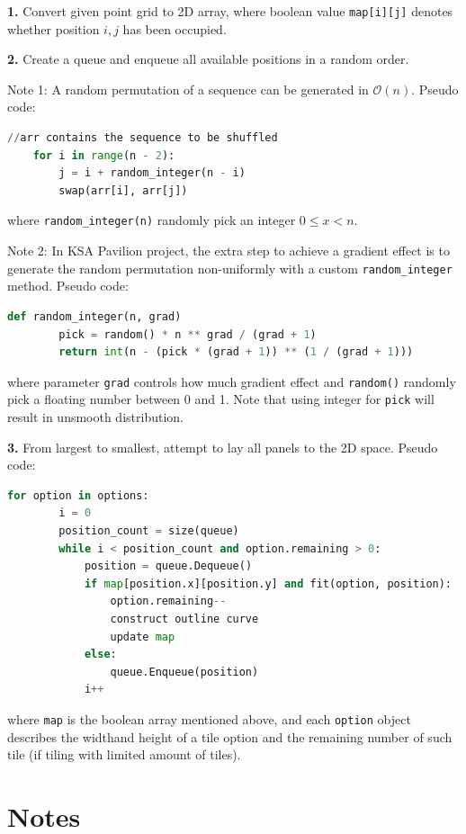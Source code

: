 \documentclass{article}
\begin{document}
\textbf{1.} Convert given point grid to 2D array, where boolean value \lstinline{map[i][j]} denotes whether position $i,j$ has been occupied.

\textbf{2.} Create a queue and enqueue all available positions in a random order.

Note 1: A random permutation of a sequence can be generated in $\mathcal{O}(n)$. Pseudo code:

\begin{lstlisting}[language=Python]
	//arr contains the sequence to be shuffled
	for i in range(n - 2):
		j = i + random_integer(n - i)
		swap(arr[i], arr[j])
\end{lstlisting}

where \lstinline{random_integer(n)} randomly pick an integer $0 \leq x < n$.

Note 2: In KSA Pavilion project, the extra step to achieve a gradient effect is to generate the random permutation non-uniformly with a custom \lstinline{random_integer} method. Pseudo code:

\begin{lstlisting}[language=Python]
	def random_integer(n, grad)
		pick = random() * n ** grad / (grad + 1)
		return int(n - (pick * (grad + 1)) ** (1 / (grad + 1)))
\end{lstlisting}

where parameter \lstinline{grad} controls how much gradient effect and \lstinline{random()} randomly pick a floating number between 0 and 1. Note that using integer for \lstinline{pick} will result in unsmooth distribution.

\textbf{3.} From largest to smallest, attempt to lay all panels to the 2D space. Pseudo code:

\begin{lstlisting}[language=Python]
	for option in options:
		i = 0
		position_count = size(queue)
		while i < position_count and option.remaining > 0:
			position = queue.Dequeue()
			if map[position.x][position.y] and fit(option, position):
				option.remaining--
				construct outline curve
				update map
			else:
				queue.Enqueue(position)
			i++
\end{lstlisting}

where \lstinline{map} is the boolean array mentioned above, and each \lstinline{option} object describes the widthand height of a tile option and the remaining number of such tile (if tiling with limited amount of tiles).

\section{Notes}
\end{document}
